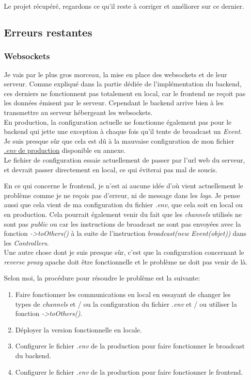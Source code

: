 \documentclass[
    iai, %
    il, %
]{heig-tb}
\begin{document}
Le projet récupéré, regardons ce qu'il reste à corriger et améliorer sur ce dernier.

\subsection{Erreurs restantes}

\subsubsection{Websockets}
Je vais par le plus gros morceau, la mise en place des \Gls{websockets} et de leur serveur.
Comme expliqué dans la partie dédiée de l'implémentation du \Gls{backend}, ces derniers ne fonctionnent pas totalement en local, car le \Gls{frontend} ne reçoit pas les données émisent par le serveur. Cependant le \Gls{backend} arrive bien à les transmettre au serveur hébergeant les \Gls{websockets}. \\
En production, la configuration actuelle ne fonctionne également pas pour le \Gls{backend} qui jette une exception à chaque fois qu'il tente de \Gls{broadcast} un \emph{Event}. Je suis presque sûr que cela est dû à la mauvaise configuration de mon fichier \href{https://github.com/heig-fablab/fablab-manager/blob/main/.env.prod.example}{\emph{.env} de production} disponible en annexe. \\
Le fichier de configuration essaie actuellement de passer par l'url web du serveur, et devrait passer directement en local, ce qui éviterai pas mal de soucis.

En ce qui concerne le frontend, je n'est ai aucune idée d'où vient actuellement le problème comme je ne reçois pas d'erreur, ni de message dans les \emph{logs}.
Je pense aussi que cela vient de ma configuration du fichier \emph{.env}, que cela soit en local ou en production.
Cela pourrait également venir du fait que les \emph{channels} utilisés ne sont pas \emph{public} ou car les instructions de \Gls{broadcast} ne sont pas envoyées avec la fonction \emph{->toOthers()} à la suite de l'instruction \emph{broadcast(new Event(objet))} dans les \emph{Controllers}. \\

Une autre chose dont je suis presque sûr, c'est que la configuration concernant le \emph{reverse proxy} \Gls{apache} doit être fonctionnelle et le problème ne doit pas venir de là.

Selon moi, la procédure pour résoudre le problème est la suivante:
\begin{enumerate}
    \item Faire fonctionner les communications en local en essayant de changer les types de \emph{channels} et / ou la configuration du fichier \emph{.env} et / ou utiliser la fonction \emph{->toOthers()}.
    \item Déployer la version fonctionnelle en locale.
    \item Configurer le fichier \emph{.env} de la production pour faire fonctionner le \Gls{broadcast} du \Gls{backend}.
    \item Configurer le fichier \emph{.env} de la production pour faire fonctionner le \Gls{frontend}.
\end{enumerate}
\end{document}
